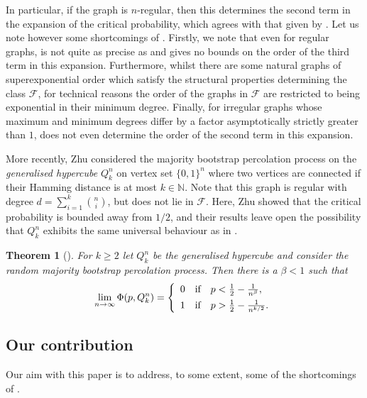 \documentclass[reqno,a4paper,11pt]{amsart}
\newcounter{prop}
\newtheorem{theorem}{Theorem}[section]
\theoremstyle{definition}
\renewcommand{\geq}{\geqslant}
\begin{document}
In particular, if the graph is $n$-regular, then this determines the second term in the expansion of the critical probability, which agrees with that given by .
Let us note however some shortcomings of .
Firstly, we note that even for regular graphs,  is not quite as precise as  and gives no bounds on the order of the third term in this expansion.
Furthermore, whilst there are some natural graphs of superexponential order which satisfy the structural properties determining the class $\mathcal{F}$, for technical reasons the order of the graphs in $\mathcal{F}$ are restricted to being exponential in their minimum degree.
Finally, for irregular graphs whose maximum and minimum degrees differ by a factor asymptotically strictly greater than $1$,  does not even determine the order of the second term in this expansion.

More recently, Zhu \cite{Zhu25} considered the majority bootstrap percolation process on the \emph{generalised hypercube} $Q_k^n$ on vertex set $\{0,1\}^n$ where two vertices are connected if their Hamming distance is at most $k \in \mathbb{N}$.
Note that this graph is regular with degree $d= \sum_{i=1}^k \binom{n}{i}$, but does not lie in $\mathcal{F}$.
Here, Zhu showed that the critical probability is bounded away from $1/2$, and their results leave open the possibility that $Q_k^n$ exhibits the same universal behaviour as in .

\begin{theorem}[{\cite[Theorem 3]{Zhu25}}]
  For $k \geq 2$ let $Q^n_k$ be the generalised hypercube and consider the random majority bootstrap percolation process.
  Then there is a $\beta<1$ such that
  \[
    \lim_{n \to \infty} \Phi(p, Q^n_k) = \left\{
      \begin{array} {c@{\quad \textup{if} \quad}l}
        0 & p < \frac{1}{2}-\frac{1}{n^{\beta}}, \\[+1ex]
        1 & p > \frac{1}{2}-\frac{1}{n^{k/2}}.
      \end{array}\right.
  \]
\end{theorem}

\subsection{Our contribution}
Our aim with this paper is to address, to some extent, some of the shortcomings of .
\end{document}
